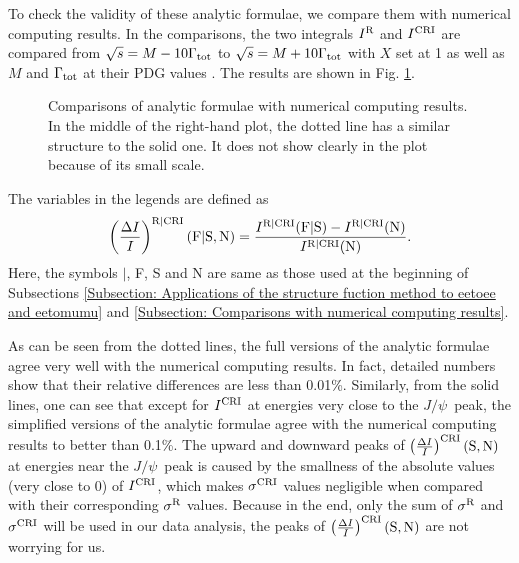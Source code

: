 \documentclass[a4paper,10pt,twoside]{cpc-hepnp}
\newcommand{\jpsi}{$J/\psi$~}
\newcommand{\Tw}{\Gamma_{\rm tot}}
\begin{document}
\begin{CJK*}{UTF8}{gbsn}
\begin{small}
\begin{multicols}{2}
		To check the validity of these analytic formulae, we compare them with numerical computing results. In the comparisons, the two integrals $I^{\rm R}$ and $I^{\rm CRI}$ are compared from $\sqrt{s}=M-10\Tw$ to $\sqrt{s}=M+10\Tw$ with $X$ set at 1 as well as $M$ and $\Tw$ at their PDG values \cite{PDG2016}. The results are shown in Fig. \ref{Figure: Comparisons with numerical computing results.}.
	\end{multicols}
	\begin{figure}[!h]
		\centering
		\caption{Comparisons of analytic formulae with numerical computing results. In the middle of the right-hand plot, the dotted line has a similar structure to the solid one. It does not show clearly in the plot because of its small scale.}
		\label{Figure: Comparisons with numerical computing results.}
	\end{figure}
	\begin{multicols}{2}
		The variables in the legends are defined as
		\begin{equation*}
			\left(\frac{\Delta I}{I}\right)^{\rm R|CRI}(\text{F}|\text{S},\text{N}) = \frac{I^{\rm R|CRI}(\text{F}|\text{S})-I^{\rm R|CRI}(\text{N})}{I^{\rm R|CRI}(\text{N})}.
		\end{equation*}
		Here, the symbols $|$, F, S and N are same as those used at the beginning of Subsections \ref{Subsection: Applications of the structure fuction method to eetoee and eetomumu} and \ref{Subsection: Comparisons with numerical computing results}.
		
		As can be seen from the dotted lines, the full versions of the analytic formulae agree very well with the numerical computing results. In fact, detailed numbers show that their relative differences are less than 0.01\%. Similarly, from the solid lines, one can see that except for $I^{\rm CRI}$ at energies very close to the \jpsi peak, the simplified versions of the analytic formulae agree with the numerical computing results to better than 0.1\%. The upward and downward peaks of $\left(\frac{\Delta I}{I}\right)^{\rm CRI}(\text{S},\text{N})$ at energies near the \jpsi peak is caused by the smallness of the absolute values (very close to 0) of $I^{\rm CRI}$, which makes $\sigma^{\rm CRI}$ values negligible when compared with their corresponding $\sigma^{\rm R}$ values. Because in the end, only the sum of $\sigma^{\rm R}$ and $\sigma^{\rm CRI}$ will be used in our data analysis, the peaks of $\left(\frac{\Delta I}{I}\right)^{\rm CRI}(\text{S},\text{N})$ are not worrying for us.
		

\end{multicols}
\end{small}
\end{CJK*}
\end{document}
